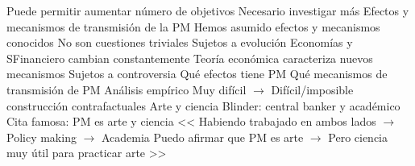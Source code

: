 \documentclass{nuevotema}
\begin{document}
\begin{esquemal}
				\4[] Puede permitir aumentar número de objetivos
				\4[] Necesario investigar más
			\3 Efectos y mecanismos de transmisión de la PM
				\4 Hemos asumido efectos y mecanismos conocidos
				\4[] No son cuestiones triviales
				\4 Sujetos a evolución
				\4[] Economías y SFinanciero cambian constantemente
				\4[] Teoría económica caracteriza nuevos mecanismos
				\4 Sujetos a controversia
				\4[] Qué efectos tiene PM
				\4[] Qué mecanismos de transmisión de PM
				\4 Análisis empírico
				\4[] Muy difícil
				\4[] $\to$ Difícil/imposible construcción contrafactuales
			\3 Arte y ciencia
				\4 Blinder: central banker y académico
				\4 Cita famosa: PM es arte y ciencia
				\4[] << Habiendo trabajado en ambos lados
				\4[] $\to$ Policy making
				\4[] $\to$ Academia
				\4[] Puedo afirmar que PM es arte
				\4[] $\to$ Pero ciencia muy útil para practicar arte >>
\end{esquemal}























\graficas
\end{document}
